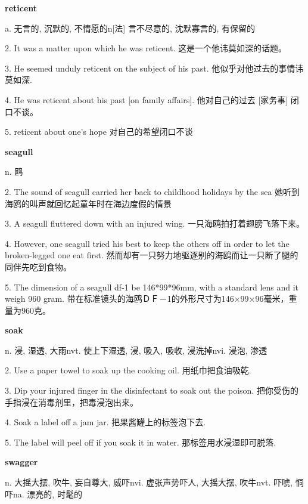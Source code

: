 \documentclass[12pt]{book}
\begin{document}
\textbf{reticent}

a. 无言的, 沉默的, 不情愿的n[法] 言不尽意的, 沈默寡言的, 有保留的

2.  It was a matter upon which he was reticent.  这是一个他讳莫如深的话题。 


3.  He seemed unduly reticent on the subject of his past.  他似乎对他过去的事情讳莫如深. 


4.  He was reticent about his past [on family affairs].  他对自己的过去 [家务事] 闭口不谈。 


5.  reticent about one's hope  对自己的希望闭口不谈 


\vspace{12pt}

\textbf{seagull}

n. 鸥

2.  The sound of seagull carried her back to childhood holidays by the sea  她听到海鸥的叫声就回忆起童年时在海边度假的情景 


3.  A seagull fluttered down with an injured wing.  一只海鸥拍打着翅膀飞落下来。 


4.  However, one seagull tried his best to keep the others off in order to let the broken-legged one eat first.  然而却有一只努力地驱逐别的海鸥而让一只断了腿的同伴先吃到食物。 


5.  The dimension of a seagull df-1 be 146*99*96mm, with a standard lens and it weigh 960 gram.  带在标准镜头的海鸥ＤＦ－1的外形尺寸为146×99×96毫米，重量为960克。 


\vspace{12pt}

\textbf{soak}

n. 浸, 湿透, 大雨nvt. 使上下湿透, 浸, 吸入, 吸收, 浸洗掉nvi. 浸泡, 渗透

2.  Use a paper towel to soak up the cooking oil.  用纸巾把食油吸乾. 


3.  Dip your injured finger in the disinfectant to soak out the poison.  把你受伤的手指浸在消毒剂里，把毒浸泡出来。 


4.  Soak a label off a jam jar.  把果酱罐上的标签泡下去. 


5.  The label will peel off if you soak it in water.  那标签用水浸湿即可脱落. 


\vspace{12pt}

\textbf{swagger}

n. 大摇大摆, 吹牛, 妄自尊大, 威吓nvi. 虚张声势吓人, 大摇大摆, 吹牛nvt. 吓唬, 恫吓na. 漂亮的, 时髦的
\end{document}
